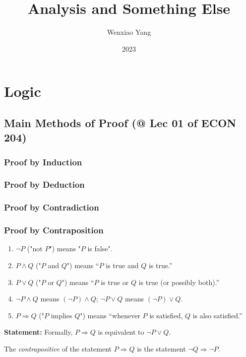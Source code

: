 \documentclass[11pt]{elegantbook}
\title{\textbf{Analysis and Something Else}}
\author{Wenxiao Yang}
\institute{Haas School of Business, University of California Berkeley}
\date{2023}
\begin{document}
\maketitle
\frontmatter
\tableofcontents
\mainmatter


\chapter{Logic}
\section{Main Methods of Proof \small{ (@ Lec 01 of ECON 204)}}
\subsection{Proof by Induction}
\subsection{Proof by Deduction}
\subsection{Proof by Contradiction}
\subsection{Proof by Contraposition}
\begin{enumerate}[$\circ$]
    \item $\lnot P$ ("not $P$") means "$P$ is false".
    \item $P \wedge Q$ ("$P$ and $Q$") means “$P$ is true and $Q$ is true.”
    \item $P \vee Q$ ("$P$ or $Q$") means “$P$ is true or $Q$ is true (or possibly both).”
    \item $\lnot P \wedge Q$ means $(\lnot P)\wedge Q$; $\lnot P \vee Q$ means $(\lnot P)\vee Q$.
    \item $P \Rightarrow Q$ ("$P$ implies $Q$") means “whenever $P$ is satisfied, $Q$ is also satisfied.”
\end{enumerate}
\textbf{Statement:} Formally, $P \Rightarrow Q$ is equivalent to $\lnot P \vee Q$.

\begin{definition}[Contrapositive]
\normalfont
The \textit{contrapositive} of the statement $P \Rightarrow Q$ is the statement $\lnot Q \Rightarrow \lnot P$.
\end{definition}
\end{document}
